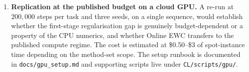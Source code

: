 \begin{enumerate}
        COOM paper.
    \item \textbf{Replication at the published budget on a
        cloud GPU.} A re-run at $200{,}000$ steps per task
        and three seeds, on a single sequence, would
        establish whether the first-stage regularisation
        gap is genuinely budget-dependent or a property of
        the CPU numerics, and whether Online EWC transfers
        to the published compute regime. The cost is
        estimated at \$0.50--\$3 of spot-instance time
        depending on the method-set scope. The setup
        runbook is documented in \texttt{docs/gpu\_setup.md}
        and supporting scripts live under
        \texttt{CL/scripts/gpu/}.
\end{enumerate}
